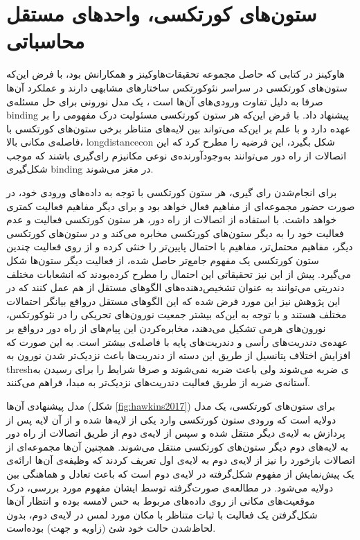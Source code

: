 \documentclass[12pt]{report}
\begin{document}
	\section{ستون‌های کورتکسی، واحد‌های مستقل محاسباتی}
	هاوکینز در کتابی \cite{Hawkins2021-rq} که حاصل مجموعه تحقیقات‌هاوکینز و همکارانش
	\cite{Hawkins2016, Hawkins2017, Lewis2019}
	بود، با فرض این‌که ستون‌های کورتکسی در سراسر نئوکورتکس ساختار‌های مشابهی دارند و عملکرد آن‌ها صرفا به دلیل تفاوت ورودی‌های آن‌ها است \cite{Mountcastle1978}، یک مدل نورونی برای حل مسئله‌ی \gls{binding} پیشنهاد داد. با فرض این‌که هر ستون کورتکسی مسئولیت درک مفهومی را بر عهده دارد و با علم بر این‌که می‌تواند بین لایه‌های متناظر برخی ستون‌های کورتکسی با فاصله‌ی مکانی بالا، \gls{longdistancecon} شکل بگیرد، این فرضیه را مطرح کرد که این اتصالات از راه دور می‌توانند به‌وجود‌آورنده‌ی نوعی مکانیزم رای‌گیری باشند که  موجب شکل‌گیری \gls{binding} در مغز می‌شوند.
	
	برای انجام‌شدن رای گیری، هر ستون کورتکسی با توجه به داده‌های ورودی خود، در صورت حضور مجموعه‌ای از مفاهیم فعال خواهد بود و برای دیگر مفاهیم فعالیت کمتری خواهد داشت. با استفاده از اتصالات از راه دور، هر ستون کورتکسی فعالیت و عدم فعالیت خود را به دیگر ستون‌های کورتکسی مخابره می‌کند و در ستون‌های کورتکسی دیگر، مفاهیم محتمل‌تر، مفاهیم با احتمال پایین‌تر را خنثی کرده و  از روی فعالیت چندین ستون کورتکسی یک مفهوم جامع‌تر حاصل شده، از فعالیت دیگر ستون‌ها شکل می‌گیرد. پیش از این نیز تحقیقاتی این احتمال را مطرح کرده‌بودند که انشعابات مختلف دندریتی می‌توانند به عنوان تشخیص‌دهنده‌های الگو‌های مستقل از هم عمل کنند \cite{POIRAZI2003989, Polsky2004} که در این پژوهش نیز این مورد فرض شده که این الگو‌های مستقل در‌واقع بیانگر احتمالات مختلف هستند و با توجه به این‌که بیشتر جمعیت نورون‌های تحریکی را در نئوکورتکس، نورون‌های هرمی تشکیل می‌دهند، مخابره‌کردن این پیام‌های از راه دور درواقع بر عهده‌ی دندریت‌های رأسی و دندریت‌های پایه‌ با فاصله‌ی بیشتر است. به این صورت که افزایش اختلاف پتانسیل از طریق این دسته‌ از دندریت‌ها باعث نزدیک‌تر شدن نورون به \gls{thresh}‌ی ضربه می‌شوند ولی باعث ضربه نمی‌شوند و صرفا شرایط را برای رسیدن به آستانه‌ی ضربه از طریق فعالیت دندریت‌های نزدیک‌تر به مبدا، فراهم می‌کنند.
	
	مدل پیشنهادی آن‌ها (شکل \ref{fig:hawkins2017}) برای ستون‌های کورتکسی، یک مدل دو‌لایه‌ است که ورودی ستون کورتکسی وارد یکی از لایه‌ها شده و از آن لایه پس از پردازش به لایه‌ی دیگر منتقل شده و سپس از لایه‌‌ی دوم از طریق اتصالات از راه دور به لا‌‌یه‌های دوم دیگر ستون‌های کورتکسی منتقل می‌شوند. همچنین آن‌ها مجموعه‌ای از اتصالات بازخورد را نیز از لایه‌ی دوم به لا‌یه‌ی اول تعریف کردند که وظیفه‌ی آن‌ها ارائه‌ی یک پیش‌نمایش از مفهوم‌ شکل‌گرفته در لايه‌ی دوم است که باعث تعادل و هماهنگی بین دو‌لایه‌ می‌شود. در مطالعه‌ی صورت‌گرفته توسط ایشان\cite{Hawkins2017} مفهوم مورد بررسی، درک موقعیت‌های مکانی از روی داده‌های مربوط به حس لامسه بوده‌ و انتظار آن‌ها شکل‌گرفتن یک فعالیت با ثبات متناظر با مکان مورد لمس در لایه‌ی دوم، بدون لحاظ‌شدن حالت خود شئ (زاویه و جهت) بوده‌است. 
	
\end{document}
